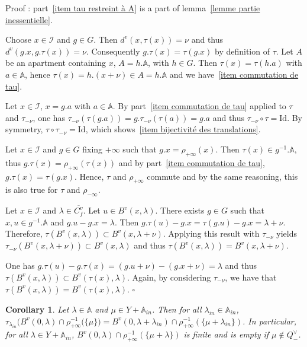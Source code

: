 \documentclass[12pt]{article}
\theoremstyle{plain}
\newtheorem{cor}[thm]{Corollary}
\theoremstyle{definition}
\newcommand{\A}{\mathbb{A}}
\newcommand{\I}{\mathcal{I}}
\newcommand{\Id}{\mathrm{Id}}
\begin{document}
Proof : part~\ref{item tau restreint à A} is a part of lemma~\ref{lemme partie inessentielle}.


Choose $x\in \I$ and $g\in G$. Then $d^v(x,\tau(x))=\nu$ and thus $d^v(g.x,g.\tau(x))=\nu$. Consequently $g.\tau(x)=\tau(g.x)$ by definition of $\tau$. Let $A$ be an apartment containing $x$, $A=h.\A$, with $h\in G$. Then $\tau(x)=\tau(h.a)$ with $a\in \A$, hence $\tau(x)=h.(x+\nu)\in A=h.\A$ and we have~\ref{item commutation de tau}.

Let $x\in\I$, $x=g.a$ with $a\in \A$. By part~\ref{item commutation de tau} applied to $\tau$ and $\tau_{-\nu}$, one has $\tau_{-\nu}(\tau(g.a))=g.\tau_{-\nu}(\tau(a))=g.a$ and thus $\tau_{-\nu}\circ\tau=\Id$. By symmetry, $\tau\circ\tau_{-\nu}=\Id$, which shows~\ref{item bijectivité des translations}.

Let $x\in \I$ and $g\in G$ fixing $+\infty$ such that $g.x=\rho_{+\infty}(x)$. 
Then $\tau(x)\in g^{-1}.\A$, thus $g.\tau(x)=\rho_{+\infty}(\tau(x))$ and by
 part~\ref{item commutation de tau}, $g.\tau(x)=\tau(g.x)$. Hence, $\tau$ and
  $\rho_{+\infty}$ commute and by the same reasoning, this is also true for $\tau$ and $\rho_{-\infty}$.

Let $x\in\I$ and $\lambda\in \overline{C_f^v}$. Let $u\in B^v(x,\lambda)$. There exists $g\in G$ such that $x,u\in g^{-1}.\A$ and $g.u-g.x=\lambda$. Then $g.\tau(u)-g.x=\tau(g.u)-g.x=\lambda+\nu$. Therefore, $\tau(B^v(x,\lambda))\subset B^v(x,\lambda+\nu)$. Applying this result with $\tau_{-\nu}$ yields $\tau_{-\nu}(B^v(x,\lambda+\nu))\subset B^v(x,\lambda)$ and thus $\tau(B^v(x,\lambda))=B^v(x,\lambda+\nu)$.

One has $g.\tau(u)-g.\tau(x)=(g.u+\nu)-(g.x+\nu)=\lambda$ and thus $\tau(B^v(x,\lambda))\subset B^v(\tau(x),\lambda)$. Again, by considering $\tau_{-\nu}$, we have that $\tau(B^v(x,\lambda))=B^v(\tau(x),\lambda)$. $\square$


 
 
\begin{cor}\label{cor finitude des boules}
Let $\lambda\in \A$ and $\mu\in Y+\A_{in}$. Then for all $\lambda_{in}\in \A_{in}$, $\tau_{\lambda_{in}}\big(B^v(0,\lambda)\cap \rho_{+\infty}^{-1}(\{\mu\}\big)=B^v(0,\lambda+\lambda_{in})\cap \rho_{+\infty}^{-1}(\{\mu+\lambda_{in}\})$. In particular, for all $\lambda\in Y+\A_{in}$, $B^v(0,\lambda)\cap \rho_{+\infty}^{-1}(\{\mu+\lambda\})$ is finite and is empty if $\mu\notin Q^\vee_-$.

\end{cor}
\end{document}
